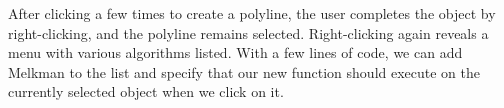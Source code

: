 After clicking a few times to create a polyline, the user completes the object
by right-clicking, and the polyline remains selected. Right-clicking again
reveals a menu with various algorithms listed. With a few lines of code, we can 
add Melkman to the list and specify that our new function should execute on
the currently selected object when we click on it. 


 


 



% 

 

